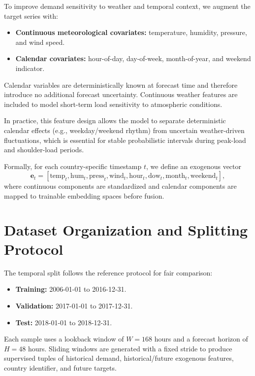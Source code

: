 To improve demand sensitivity to weather and temporal context, we augment the
target series with:

\begin{itemize}
  \item \textbf{Continuous meteorological covariates:} temperature,
        humidity, pressure, and wind speed.
  \item \textbf{Calendar covariates:} hour-of-day, day-of-week,
        month-of-year, and weekend indicator.
\end{itemize}

Calendar variables are deterministically known at forecast time and therefore
introduce no additional forecast uncertainty. Continuous weather features are
included to model short-term load sensitivity to atmospheric conditions.

In practice, this feature design allows the model to separate deterministic
calendar effects (e.g., weekday/weekend rhythm) from uncertain
weather-driven fluctuations, which is essential for stable probabilistic
intervals during peak-load and shoulder-load periods.

Formally, for each country-specific timestamp $t$, we define an exogenous
vector
\begin{equation}
\mathbf{e}_t = [\mathrm{temp}_t,\mathrm{hum}_t,\mathrm{press}_t,\mathrm{wind}_t,
\mathrm{hour}_t,\mathrm{dow}_t,\mathrm{month}_t,\mathrm{weekend}_t],
\label{eq:exog_vector}
\end{equation}
where continuous components are standardized and calendar components are
mapped to trainable embedding spaces before fusion.

\section{Dataset Organization and Splitting Protocol}
\label{sec:data_split}

The temporal split follows the reference protocol for fair comparison:

\begin{itemize}
  \item \textbf{Training:} 2006-01-01 to 2016-12-31.
  \item \textbf{Validation:} 2017-01-01 to 2017-12-31.
  \item \textbf{Test:} 2018-01-01 to 2018-12-31.
\end{itemize}

Each sample uses a lookback window of $W=168$ hours and a forecast horizon of
$H=48$ hours. Sliding windows are generated with a fixed stride to produce
supervised tuples of historical demand, historical/future exogenous features,
country identifier, and future targets.

